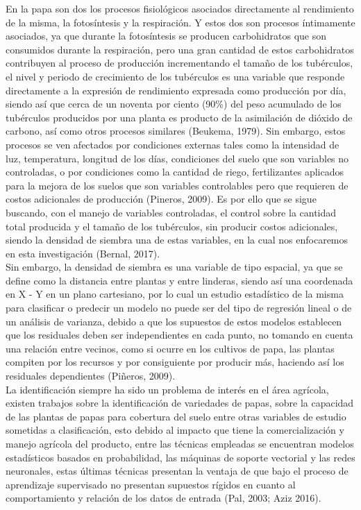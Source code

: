En la papa son dos los procesos fisiológicos asociados directamente al rendimiento de la misma, la fotosíntesis y la respiración. Y estos dos son procesos íntimamente asociados, ya que durante la fotosíntesis se producen carbohidratos que son consumidos durante la respiración, pero una gran cantidad de estos carbohidratos contribuyen al proceso de producción incrementando el tamaño de los tubérculos, el nivel y periodo de crecimiento de los tubérculos es una variable que responde directamente a la expresión de rendimiento expresada como producción por día, siendo así que cerca de un noventa por ciento (90\%) del peso acumulado de los tubérculos producidos por una planta es producto de la asimilación de dióxido de carbono, así como otros procesos similares (Beukema, 1979). Sin embargo, estos procesos se ven afectados por condiciones externas tales como la intensidad de luz, temperatura, longitud de los días, condiciones del suelo que son variables no controladas, o por condiciones como la cantidad de riego, fertilizantes aplicados para la mejora de los suelos que son variables controlables pero que requieren de costos adicionales de producción (Pineros, 2009). Es por ello que se sigue buscando, con el manejo de variables controladas,  el control sobre la cantidad total producida y el tamaño de los tubérculos,  sin producir costos adicionales, siendo la densidad de siembra una de estas variables, en la cual nos enfocaremos en esta investigación (Bernal, 2017).\\

Sin embargo,  la densidad de siembra es una variable de tipo espacial, ya que se define como la distancia entre plantas y entre linderas, siendo así una coordenada en X - Y en un plano cartesiano, por lo cual un estudio estadístico de la misma para clasificar o predecir un modelo no puede ser del tipo de regresión lineal o de un análisis de varianza,  debido a que los supuestos de estos modelos establecen que los residuales deben ser independientes en cada punto, no tomando en cuenta una relación entre vecinos, como si ocurre en los cultivos de papa, las plantas compiten por los recursos y por consiguiente por producir más, haciendo así los residuales dependientes  (Pi\~neros, 2009). \\

La identificación siempre ha sido un problema de interés en el área agrícola, existen trabajos sobre la identificación de variedades de papas, sobre la capacidad de las plantas de papas para cobertura del suelo entre otras variables de estudio sometidas a clasificación, esto debido al impacto que tiene la comercialización y manejo agrícola del producto, entre las técnicas empleadas se encuentran modelos estadísticos basados en probabilidad, las máquinas de soporte vectorial y las redes neuronales, estas últimas técnicas presentan la ventaja de que bajo el proceso de aprendizaje supervisado no presentan supuestos rígidos en cuanto al comportamiento y relación de los datos de entrada (Pal, 2003; Aziz 2016).\\

